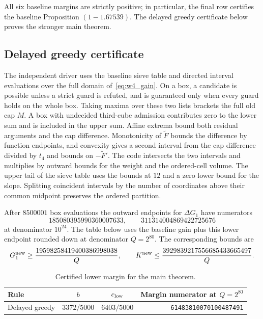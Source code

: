 \documentclass[11pt,reqno]{amsart}
\theoremstyle{remark}
\newcommand{\normF}{\widetilde{F}}
\numberwithin{equation}{section}
\begin{document}
All six baseline margins are strictly positive; in particular, the final row certifies the baseline Proposition $(1-1.67539)$. The delayed greedy certificate below proves the stronger main theorem.

\subsection{Delayed greedy certificate}
The independent driver  uses the baseline sieve table and directed interval evaluations over the full domain of~\eqref{eq:w4_gain}. On a box, a candidate is possible unless a strict guard is refuted, and is guaranteed only when every guard holds on the whole box. Taking maxima over these two lists brackets the full old cap $M$. A box with undecided third-cube admission contributes zero to the lower sum and is included in the upper sum. Affine extrema bound both residual arguments and the cap difference. Monotonicity of $\normF$ bounds the difference by function endpoints, and convexity gives a second interval from the cap difference divided by $t_4$ and bounds on $-\normF'$. The code intersects the two intervals and multiplies by outward bounds for the weight and the ordered-cell volume. The upper tail of the sieve table uses the bounds at $12$ and a zero lower bound for the slope. Splitting coincident intervals by the number of coordinates above their common midpoint preserves the ordered partition.

After $8500001$ box evaluations the outward endpoints for $\Delta G_1$ have numerators
\[
185080395990360007633,\qquad 311314004869422725676
\]
at denominator $10^{24}$. The table below uses the baseline gain plus this lower endpoint rounded down at denominator $Q=2^{80}$. The corresponding bounds are
\[
G_1^{\rm new}\ge \frac{19598258419400386998038}{Q},
\qquad K^{\rm new}\le \frac{3929839217556685433665497}{Q}.
\]

\begin{table}[ht]
\centering
\begin{tabular}{@{}lccr@{}}
\toprule
Rule & $b$ & $c_{\rm low}$ & Margin numerator at $Q=2^{80}$ \\
\midrule
Delayed greedy & $3372/5000$ & $6403/5000$ & \texttt{61483810070100487491} \\
\bottomrule
\end{tabular}
\caption{Certified lower margin for the main theorem.}
\end{table}
\end{document}
